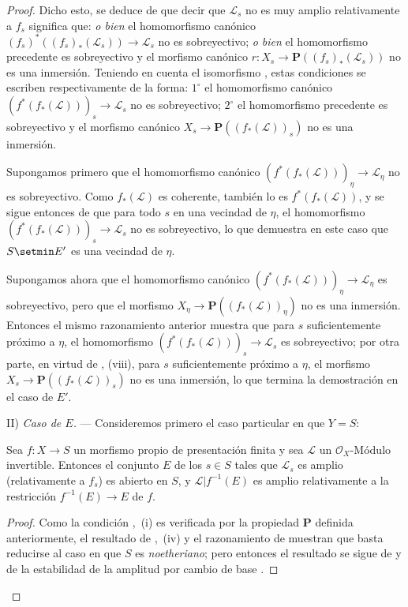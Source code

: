 \begin{proof}
Dicho esto, se deduce de  que decir que $\mathcal L_s$ no es muy amplio relativamente a $f_s$ significa que: \emph{o bien} el homomorfismo canónico $(f_s)^*((f_s)_*(\mathcal L_s))\to\mathcal L_s$ no es sobreyectivo; \emph{o bien} el homomorfismo precedente es sobreyectivo y el morfismo canónico $r:X_s\to\mathbf P((f_s)_*(\mathcal L_s))$ no es una inmersión.
Teniendo en cuenta el isomorfismo , estas condiciones se escriben respectivamente de la forma: $1^\circ$ el homomorfismo canónico $(f^*(f_*(\mathcal L)))_s\to\mathcal L_s$ no es sobreyectivo; $2^\circ$ el homomorfismo precedente es sobreyectivo y el morfismo canónico $X_s\to\mathbf P((f_*(\mathcal L))_s)$ no es una inmersión.

Supongamos primero que el homomorfismo canónico $(f^*(f_*(\mathcal L)))_\eta\to\mathcal L_\eta$ no es sobreyectivo.
Como $f_*(\mathcal L)$ es coherente, también lo es $f^*(f_*(\mathcal L))$, y se sigue entonces de  que para todo $s$ en una vecindad de $\eta$, el homomorfismo $(f^*(f_*(\mathcal L)))_s\to\mathcal L_s$ no es sobreyectivo, lo que demuestra en este caso que $S\setmin E'$ es una vecindad de $\eta$.

Supongamos ahora que el homomorfismo canónico $(f^*(f_*(\mathcal L)))_\eta\to\mathcal L_\eta$ es sobreyectivo, pero que el morfismo $X_\eta\to\mathbf P((f_*(\mathcal L))_\eta)$ no es una inmersión.
Entonces el mismo razonamiento anterior muestra que para $s$ suficientemente próximo a $\eta$, el homomorfismo $(f^*(f_*(\mathcal L)))_s\to\mathcal L_s$ es sobreyectivo; por otra parte, en virtud de , (viii), para $s$ suficientemente próximo a $\eta$, el morfismo $X_s\to\mathbf P((f_*(\mathcal L))_s)$ no es una inmersión, lo que termina la demostración en el caso de $E'$.

II) \emph{Caso de $E$.} --- Consideremos primero el caso particular en que $Y=S$:

\begin{corollary}[9.6.4]
\label{IV.9.6.4}
Sea $f:X\to S$ un morfismo \textup{propio} de presentación finita y sea $\mathcal L$ un $\mathcal O_X$-Módulo invertible.
Entonces el conjunto $E$ de los $s\in S$ tales que $\mathcal L_s$ es amplio (relativamente a $f_s$) es abierto en $S$, y $\mathcal L|f^{-1}(E)$ es amplio relativamente a la restricción $f^{-1}(E)\to E$ de $f$.
\end{corollary}

\begin{proof}
Como la condición ,~(i) es verificada por la propiedad $\boldsymbol{P}$ definida anteriormente, el resultado de ,~(iv) y el razonamiento de  muestran que basta reducirse al caso en que $S$ es \emph{noetheriano}; pero entonces el resultado se sigue de  y de la estabilidad de la amplitud por cambio de base .
\end{proof}


\end{proof}

